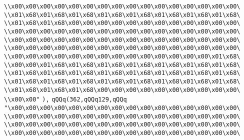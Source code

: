 \verb|\\x00\x00\x00\x00\x00\x00\x00\x00\x00\x00\x00\x00\x00\x00\x00\x00\|\newline
\verb|\\x01\x68\x01\x68\x01\x68\x01\x68\x01\x68\x01\x68\x01\x68\x01\x68\|\newline
\verb|\\x01\x68\x01\x68\x00\x00\x00\x00\x00\x00\x00\x00\x00\x00\x00\x00\|\newline
\verb|\\x00\x00\x00\x00\x00\x00\x00\x00\x00\x00\x00\x00\x00\x00\x00\x00\|\newline
\verb|\\x00\x00\x00\x00\x00\x00\x00\x00\x00\x00\x00\x00\x00\x00\x00\x00\|\newline
\verb|\\x00\x00\x00\x00\x00\x00\x00\x00\x00\x00\x00\x00\x00\x00\x00\x00\|\newline
\verb|\\x00\x00\x00\x00\x00\x00\x00\x00\x00\x00\x00\x00\x00\x00\x01\x68\|\newline
\verb|\\x00\x00\x01\x68\x01\x68\x01\x68\x01\x68\x01\x68\x01\x68\x01\x68\|\newline
\verb|\\x01\x68\x01\x68\x01\x68\x01\x68\x01\x68\x01\x68\x01\x68\x01\x68\|\newline
\verb|\\x01\x68\x01\x68\x01\x68\x01\x68\x01\x68\x01\x68\x01\x68\x01\x68\|\newline
\verb|\\x01\x68\x01\x68\x01\x68\x00\x00\x00\x00\x00\x00\x00\x00\x00\x00\|\newline
\verb|\\x00\x00"|\newline
\verb|),|\newline
\verb|qQQq(362,qQQq129,qQQq|\newline
\verb|"\x00\x00\x00\x00\x00\x00\x00\x00\x00\x00\x00\x00\x00\x00\x00\x00\|\newline
\verb|\\x00\x00\x00\x00\x00\x00\x00\x00\x00\x00\x00\x00\x00\x00\x00\x00\|\newline
\verb|\\x00\x00\x00\x00\x00\x00\x00\x00\x00\x00\x00\x00\x00\x00\x00\x00\|\newline
\verb|\\x00\x00\x00\x00\x00\x00\x00\x00\x00\x00\x00\x00\x00\x00\x00\x00\|\newline
